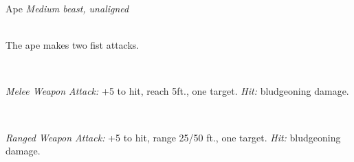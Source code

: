 \documentclass[10pt,twoside,twocolumn,openany]{book}
\begin{document}
\begin{monsterboxnobg}{Ape}
	\textit{Medium beast, unaligned}\\
	\hline
	\basics[
		armorclass	= 12,
		hitpoints 		= \dice{3d8 + 6},
		speed		= {30 ft., climb 30 ft.}
	]
	\hline
	\stats[
		STR	= \stat{16},
		DEX	= \stat{14},
		CON	= \stat{14},
		INT	= \stat{6},
		WIS	= \stat{12},
		CHA	= \stat{7}
	]
	\hline
	\details[
		skills			= {Athletics +5, Perception +3},
		senses		= {passive Perception 13},
		languages		= {-},
		challenge		= 1/2
	]
	\hline \\[1mm]
	\begin{monsteraction}[Multiattack]
		The ape makes two fist attacks.
	\end{monsteraction}\\
	\begin{monsteraction}[Multiattack]
		\textit{Melee Weapon Attack:} +5 to hit, reach 5ft., one target. \textit{Hit:}  bludgeoning damage.
	\end{monsteraction}\\
	\begin{monsteraction}[Rock]
		\textit{Ranged Weapon Attack:} +5 to hit, range 25/50 ft., one target. \textit{Hit:}  bludgeoning damage.
	\end{monsteraction}
\end{monsterboxnobg}
\end{document}
